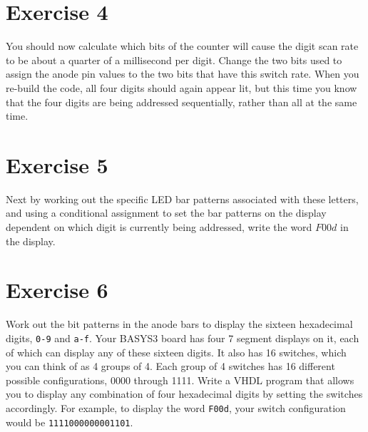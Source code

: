 \documentclass[../physical_computing.tex]{subfiles}
\begin{document}
\section{Exercise 4}
\label{sec:fastcycle}

You should now calculate which bits of the counter will cause the digit scan rate to be about a quarter of a millisecond per digit. Change the two bits used to assign the anode pin values to the two bits that have this switch rate. When you re-build the code, all four digits should again appear lit, but this time you know that the four digits are being addressed sequentially, rather than all at the same time.

\section{Exercise 5}
\label{sec:food}

Next by working out the specific LED bar patterns associated with these letters, and using a conditional assignment to set the bar patterns on 
the display dependent on which digit is currently being addressed, write
the word $F00d$ in the display.

\section{Exercise 6}
\label{sec:switchdisplay}

Work out the bit patterns in the anode bars to display the sixteen hexadecimal digits, \texttt{0-9} and \texttt{a-f}. 
Your BASYS3 board has four 7 segment displays on it, each of which can display any of these sixteen digits. It also has 16 switches, which you can think of as 4 groups of 4. Each group of 4 switches has 16 different possible configurations, 0000 through 1111. Write a VHDL program that allows you to display any combination of four hexadecimal digits by setting the switches accordingly. For example, to display the word \texttt{F00d}, your switch configuration would be \texttt{1111000000001101}. 
\end{document}
